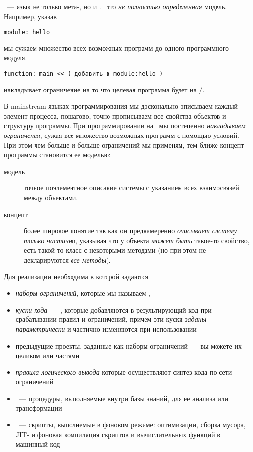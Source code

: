 \clearpage
{}\label{concept}

\metal\ --- язык не только мета-, но и .
\ это \emph{не полностью определенная} модель. Например, указав

\begin{lstlisting}
module: hello
\end{lstlisting}
\noindent
мы сужаем множество всех возможных программ до одного программного модуля.

\begin{lstlisting}
function: main << ( добавить в module:hello )
\end{lstlisting}
\noindent
накладывает ограничение на то что целевая программа будет на \emc/\cpp.

\medskip
В mainstream языках программирования мы досконально описываем каждый элемент
процесса, пошагово, точно прописываем все свойства объектов и структуру
программы. При программировании на \metal\ мы постепенно \emph{накладываем
ограничения}, сужая все множество возможных программ с помощью условий.
При этом чем больше и больше ограничений мы применям, тем ближе концепт
программы становится ее моделью:
\begin{description}
\item[модель] точное поэлементное описание системы с указанием всех
взаимосвязей между объектами.
\item[концепт] более широкое понятие так как он преднамеренно \emph{описывает
систему только частично}, указывая что у объекта \emph{может быть} такое-то
свойство, есть такой-то класс с некоторыми методами (но при этом не
декларируются \emph{все методы}).
\end{description}

\noindent
Для реализации  \cite{tyugu} необходима
 в которой задаются
\begin{itemize}
  \item 
\emph{наборы ограничений}, которые мы называем ,
\item 
\emph{куски кода}\ --- , которые добавляются в результирующий
код при срабатывании правил и ограничений, причем эти куски \emph{заданы
параметрически} и частично изменяются при использовании
 \item
предыдущие проекты, заданные как наборы ограничений\ --- вы можете
 их целиком или частями
\item 
\emph{правила логического вывода} которые осуществляют синтез кода по сети
ограничений
\item 
{}\ ---  процедуры, выполняемые внутри базы
знаний, для ее анализа или трансформации
\item
{}\ --- скрипты, выполнемые в фоновом режиме: оптимизации, сборка
мусора, JIT- и фоновая компиляция скриптов и вычислительных функций в машинный
код
\end{itemize} 

